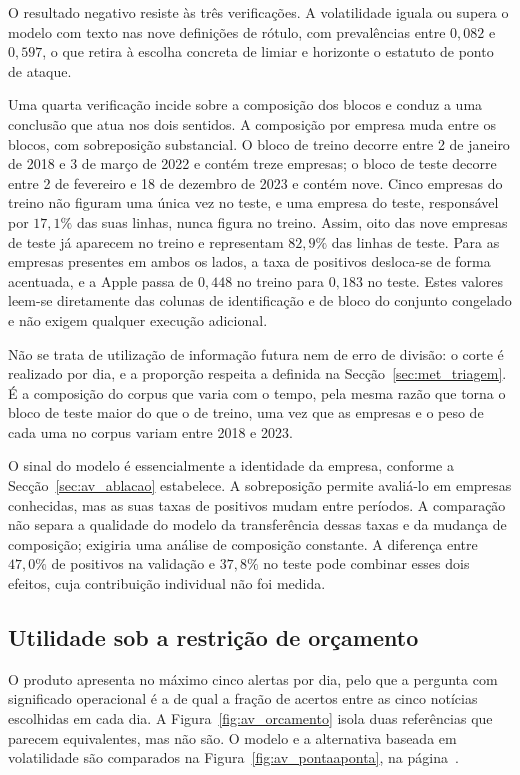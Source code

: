 O resultado negativo resiste às três verificações. A volatilidade iguala ou supera o modelo com texto
nas nove definições de rótulo, com prevalências entre $0{,}082$ e $0{,}597$, o que retira à escolha
concreta de limiar e horizonte o estatuto de ponto de ataque.

Uma quarta verificação incide sobre a composição dos blocos e conduz a uma conclusão que atua nos
dois sentidos. A composição por empresa muda entre os blocos, com sobreposição substancial. O bloco de treino decorre entre 2 de
janeiro de 2018 e 3 de março de 2022 e contém treze empresas; o bloco de teste decorre entre 2 de
fevereiro e 18 de dezembro de 2023 e contém nove. Cinco empresas do treino não figuram uma única vez
no teste, e uma empresa do teste, responsável por $17{,}1\%$ das suas linhas, nunca figura no treino.
Assim, oito das nove empresas de teste já aparecem no treino e representam $82{,}9\%$ das linhas de teste.
Para as empresas presentes em ambos os lados, a taxa de positivos desloca-se de forma acentuada, e a
Apple passa de $0{,}448$ no treino para $0{,}183$ no teste. Estes valores leem-se diretamente das
colunas de identificação e de bloco do conjunto congelado e não exigem qualquer execução adicional.

Não se trata de utilização de informação futura nem de erro de divisão: o corte é realizado por dia,
e a proporção respeita a definida na Secção~\ref{sec:met_triagem}. É a composição do corpus que varia
com o tempo, pela mesma razão que torna o bloco de teste maior do que o de treino, uma vez que as
empresas e o peso de cada uma no corpus variam entre 2018 e 2023.

O sinal do modelo é essencialmente a identidade da empresa, conforme a
Secção~\ref{sec:av_ablacao} estabelece. A sobreposição permite avaliá-lo em empresas conhecidas,
mas as suas taxas de positivos mudam entre períodos. A comparação não separa a qualidade do modelo
da transferência dessas taxas e da mudança de composição; exigiria uma análise de composição
constante. A diferença entre $47{,}0\%$ de positivos na validação e $37{,}8\%$ no teste pode
combinar esses dois efeitos, cuja contribuição individual não foi medida.

\subsection{Utilidade sob a restrição de orçamento}

O produto apresenta no máximo cinco alertas por dia, pelo que a pergunta com significado operacional
é a de qual a fração de acertos entre as cinco notícias escolhidas em cada dia. A
Figura~\ref{fig:av_orcamento} isola duas referências que parecem equivalentes, mas não são.
O modelo e a alternativa baseada em volatilidade são comparados na
Figura~\ref{fig:av_pontaaponta}, na página~\pageref{fig:av_pontaaponta}.

